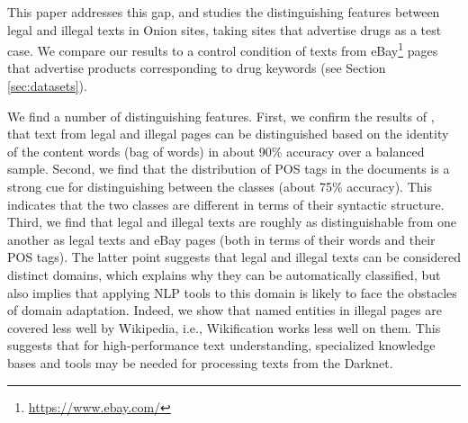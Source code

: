 \documentclass[11pt,a4paper,table]{article}
\newcommand{\es}[1]{\footnote{\color{purple}ES: #1}}
\begin{document}
  
  This paper addresses this gap, and studies the distinguishing features between legal and illegal texts in Onion sites,
  taking sites that advertise drugs as a test case. We compare our results to a control condition of texts 
  from eBay\footnote{\url{https://www.ebay.com/}} pages that 
	advertise products corresponding to drug keywords (see Section \ref{sec:datasets}).
 
  We find a number of distinguishing features. First, we confirm the results of \citet{Avarikioti18}, 
	that text from legal and illegal pages can be distinguished based on the identity of the content words (bag of words) 
  in about 90\% accuracy over a balanced sample. Second, we find that the distribution of POS tags in the documents is a strong cue for 
	distinguishing between the classes (about 75\% accuracy). This indicates that the two classes are different in 
	terms of their syntactic structure. Third, we find that legal and illegal texts are roughly as distinguishable from one another as legal 
	texts and eBay pages (both in terms of their words and their POS tags). 
	The latter point suggests that legal and illegal texts can be considered distinct domains, which explains why they can be 
	automatically classified, but also implies that applying NLP tools to this domain is likely to face the obstacles of domain adaptation.  
  Indeed, we show that named entities in illegal pages are covered less well by Wikipedia, i.e., Wikification works less well on them.
  This suggests that for high-performance text understanding, specialized knowledge bases and tools may be needed for processing texts from the Darknet.
  
  
	
%   
%   
%   
%
%
%
%
\end{document}

